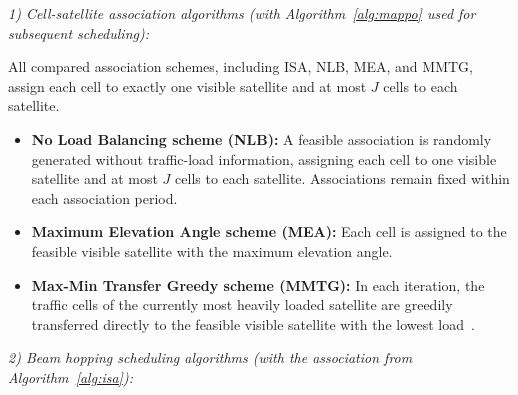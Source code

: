 \documentclass[journal]{IEEEtran}
\newcommand{\revbegin}[1]{\color{revisionblue}\ignorespaces}
\newcommand{\revend}[1]{\color{black}\ignorespaces}
\begin{document}
\revbegin{}\textit{1) Cell-satellite association algorithms (with Algorithm~\ref{alg:mappo} used for subsequent scheduling):}\revend{}

\revbegin{}All compared association schemes, including ISA, NLB, MEA, and MMTG, assign each cell to exactly one visible satellite and at most $J$ cells to each satellite.\revend{}

\revbegin{}\begin{itemize}
    \item \textbf{No Load Balancing scheme (NLB):} A feasible association is randomly generated without traffic-load information, assigning each cell to one visible satellite and at most $J$ cells to each satellite. Associations remain fixed within each association period.
    \item \textbf{Maximum Elevation Angle scheme (MEA):} Each cell is assigned to the feasible visible satellite with the maximum elevation angle.
    \item \textbf{Max-Min Transfer Greedy scheme (MMTG):} In each iteration, the traffic cells of the currently most heavily loaded satellite are greedily transferred directly to the feasible visible satellite with the lowest load~\cite{ref21,ref23}.
\end{itemize}\revend{}

\revbegin{}\textit{2) Beam hopping scheduling algorithms (with the association from Algorithm~\ref{alg:isa}):}\revend{}
\end{document}
